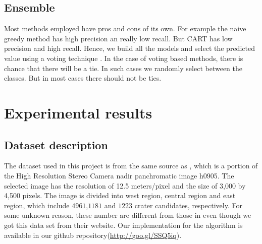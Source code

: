 \documentclass[conference]{IEEEtran}
\begin{document}
\subsection{Ensemble}
Most methods employed have pros and cons of its own. For example the naive greedy method has high precision an really low recall. But CART has low precision and high recall. Hence, we build all the models and select the predicted value using a voting technique \cite{voting}. In the case of voting based methods, there is chance that there will be a tie. In such cases we randomly select between the classes. But in most cases there should not be ties.


\section{Experimental results}
\subsection{Dataset description}

The dataset used in this project is from the same source as \cite{ding2011subkilometer}, which is a portion of the High Resolution Stereo Camera nadir panchromatic image h0905. The selected image has the resolution of 12.5 meters/pixel and the size of 3,000 by 4,500 pixels. The image is divided into west region, central region and east region, which include $4961$,$1181$ and $1223$ crater candidates, respectively. For some unknown reason, these number are different from those in \cite{ding2011subkilometer} even though we got this data set from their website. Our implementation for the algorithm is available in our github repository(\url{http://goo.gl/SSQ5iq}).
\end{document}
